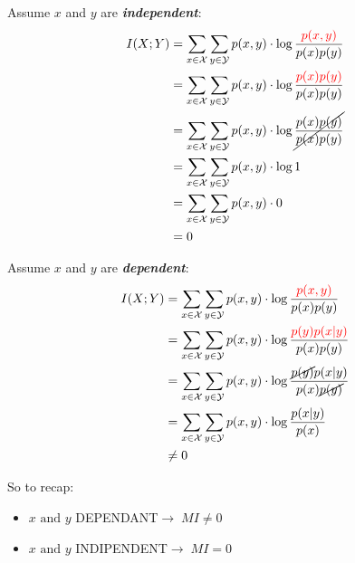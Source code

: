 \begin{center}
    \begin{minipage}[t]{0.4\textwidth}
        \noindent
        Assume $x$ and $y$ are \textit{\textbf{independent}}:
        \begin{equation}
            \begin{split}
                I(X;Y)&=\sum_{x\in\mathcal{X}}\sum_{y\in\mathcal{Y}}p(x,y)\cdot\log{\frac{\textcolor{red}{p(x,y)}}{p(x)p(y)}}\\
                &=\sum_{x\in\mathcal{X}}\sum_{y\in\mathcal{Y}}p(x,y)\cdot\log{\frac{\textcolor{red}{p(x)p(y)}}{p(x)p(y)}}\\
                &=\sum_{x\in\mathcal{X}}\sum_{y\in\mathcal{Y}}p(x,y)\cdot\log{\cancel{\frac{p(x)p(y)}{p(x)p(y)}}}\\
                &=\sum_{x\in\mathcal{X}}\sum_{y\in\mathcal{Y}}p(x,y)\cdot\log{1}\\
                &=\sum_{x\in\mathcal{X}}\sum_{y\in\mathcal{Y}}p(x,y)\cdot0\\
                &=0
            \end{split}
        \end{equation}
    \end{minipage}
    \begin{minipage}[t]{0.4\textwidth}
        \noindent
        Assume $x$ and $y$ are \textit{\textbf{dependent}}:
        \begin{equation}
            \begin{split}
                I(X;Y)&=\sum_{x\in\mathcal{X}}\sum_{y\in\mathcal{Y}}p(x,y)\cdot\log{\frac{\textcolor{red}{p(x,y)}}{p(x)p(y)}}\\
                &=\sum_{x\in\mathcal{X}}\sum_{y\in\mathcal{Y}}p(x,y)\cdot\log{\frac{\textcolor{red}{p(y)p(x|y)}}{p(x)p(y)}}\\
                &=\sum_{x\in\mathcal{X}}\sum_{y\in\mathcal{Y}}p(x,y)\cdot\log{\frac{\cancel{p(y)}p(x|y)}{p(x)\cancel{p(y)}}}\\
                &=\sum_{x\in\mathcal{X}}\sum_{y\in\mathcal{Y}}p(x,y)\cdot\log{\frac{p(x|y)}{p(x)}}\\
                &\ne 0
            \end{split}
        \end{equation}
    \end{minipage}
\end{center}
So to recap:
\begin{itemize}
    \item $x \text{ and } y$ DEPENDANT$\rightarrow\;MI\ne 0$
    \item $x \text{ and } y$ INDIPENDENT$\rightarrow\;MI=0$
\end{itemize}
